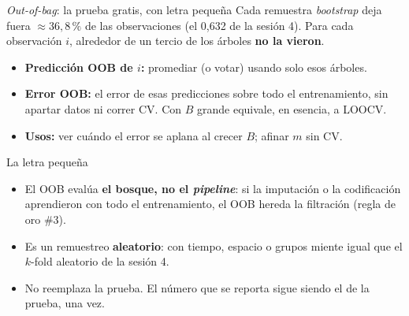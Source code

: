 \documentclass{beamer}
\newcommand{\1}{\mathbb{I}}
\begin{document}
\begin{frame}{\emph{Out-of-bag}: la prueba gratis, con letra pequeña}
\small
Cada remuestra \emph{bootstrap} deja fuera $\approx 36{,}8\,\%$ de las observaciones (el 0,632 de la sesión 4). Para cada observación $i$, alrededor de un tercio de los árboles \textbf{no la vieron}.
\begin{itemize}\itemsep3pt
  \item \textbf{Predicción OOB de $i$:} promediar (o votar) usando solo esos árboles.
  \item \textbf{Error OOB:} el error de esas predicciones sobre todo el entrenamiento, sin apartar datos ni correr CV. Con $B$ grande equivale, en esencia, a LOOCV. \pause
  \item \textbf{Usos:} ver cuándo el error se aplana al crecer $B$; afinar $m$ sin CV.
\end{itemize}
\pause
\vspace{0.1cm}
\begin{block}{La letra pequeña}
\begin{itemize}\itemsep2pt
  \item El OOB evalúa \textbf{el bosque, no el \emph{pipeline}}: si la imputación o la codificación aprendieron con todo el entrenamiento, el OOB hereda la filtración (regla de oro \#3).
  \item Es un remuestreo \textbf{aleatorio}: con tiempo, espacio o grupos miente igual que el $k$-fold aleatorio de la sesión 4.
  \item No reemplaza la prueba. El número que se reporta sigue siendo el de la prueba, una vez.
\end{itemize}
\end{block}
\end{frame}
\end{document}
